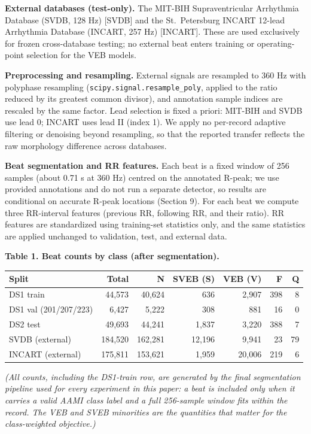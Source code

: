 \documentclass[
]{article}
\begin{document}
\textbf{External databases (test-only).} The MIT-BIH Supraventricular
Arrhythmia Database (SVDB, 128 Hz) {[}SVDB{]} and the St.~Petersburg
INCART 12-lead Arrhythmia Database (INCART, 257 Hz) {[}INCART{]}. These
are used exclusively for frozen cross-database testing; no external beat
enters training or operating-point selection for the VEB models.

\textbf{Preprocessing and resampling.} External signals are resampled to
360 Hz with polyphase resampling (\texttt{scipy.signal.resample\_poly},
applied to the ratio reduced by its greatest common divisor), and
annotation sample indices are rescaled by the same factor. Lead
selection is fixed a priori: MIT-BIH and SVDB use lead 0; INCART uses
lead II (index 1). We apply no per-record adaptive filtering or
denoising beyond resampling, so that the reported transfer reflects the
raw morphology difference across databases.

\textbf{Beat segmentation and RR features.} Each beat is a fixed window
of 256 samples (about 0.71 s at 360 Hz) centred on the annotated R-peak;
we use provided annotations and do not run a separate detector, so
results are conditional on accurate R-peak locations (Section 9). For
each beat we compute three RR-interval features (previous RR, following
RR, and their ratio). RR features are standardized using training-set
statistics only, and the same statistics are applied unchanged to
validation, test, and external data.

\textbf{Table 1. Beat counts by class (after segmentation).}

\begin{longtable}[]{@{}lrrrrrr@{}}
\toprule\noalign{}
Split & Total & N & SVEB (S) & VEB (V) & F & Q \\
\midrule\noalign{}
\endhead
\bottomrule\noalign{}
\endlastfoot
DS1 train & 44,573 & 40,624 & 636 & 2,907 & 398 & 8 \\
DS1 val (201/207/223) & 6,427 & 5,222 & 308 & 881 & 16 & 0 \\
DS2 test & 49,693 & 44,241 & 1,837 & 3,220 & 388 & 7 \\
SVDB (external) & 184,520 & 162,281 & 12,196 & 9,941 & 23 & 79 \\
INCART (external) & 175,811 & 153,621 & 1,959 & 20,006 & 219 & 6 \\
\end{longtable}

\emph{(All counts, including the DS1-train row, are generated by the
final segmentation pipeline used for every experiment in this paper: a
beat is included only when it carries a valid AAMI class label and a
full 256-sample window fits within the record. The VEB and SVEB
minorities are the quantities that matter for the class-weighted
objective.)}
\end{document}
